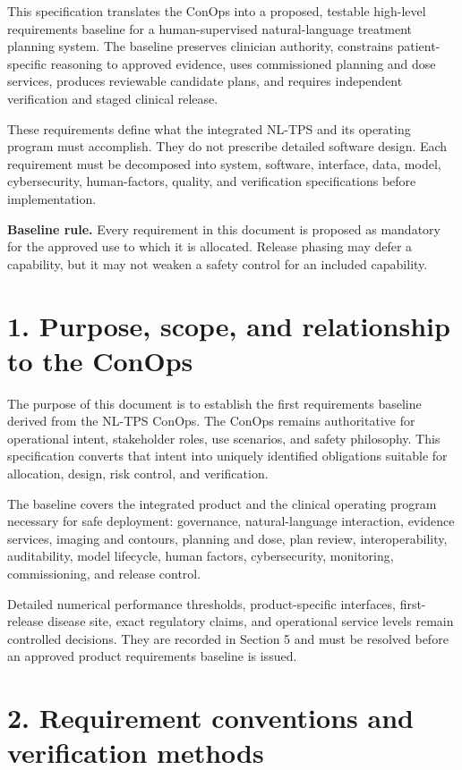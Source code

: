 \documentclass[11pt,letterpaper]{article}
\begin{document}
This specification translates the ConOps into a proposed, testable high-level requirements baseline for a human-supervised natural-language treatment planning system. The baseline preserves clinician authority, constrains patient-specific reasoning to approved evidence, uses commissioned planning and dose services, produces reviewable candidate plans, and requires independent verification and staged clinical release.

These requirements define what the integrated NL-TPS and its operating program must accomplish. They do not prescribe detailed software design. Each requirement must be decomposed into system, software, interface, data, model, cybersecurity, human-factors, quality, and verification specifications before implementation.

\textbf{Baseline rule. }Every requirement in this document is proposed as mandatory for the approved use to which it is allocated. Release phasing may defer a capability, but it may not weaken a safety control for an included capability.

\section{1. Purpose, scope, and relationship to the ConOps}

The purpose of this document is to establish the first requirements baseline derived from the NL-TPS ConOps. The ConOps remains authoritative for operational intent, stakeholder roles, use scenarios, and safety philosophy. This specification converts that intent into uniquely identified obligations suitable for allocation, design, risk control, and verification.

The baseline covers the integrated product and the clinical operating program necessary for safe deployment: governance, natural-language interaction, evidence services, imaging and contours, planning and dose, plan review, interoperability, auditability, model lifecycle, human factors, cybersecurity, monitoring, commissioning, and release control.

Detailed numerical performance thresholds, product-specific interfaces, first-release disease site, exact regulatory claims, and operational service levels remain controlled decisions. They are recorded in Section 5 and must be resolved before an approved product requirements baseline is issued.

\section{2. Requirement conventions and verification methods}
\end{document}
